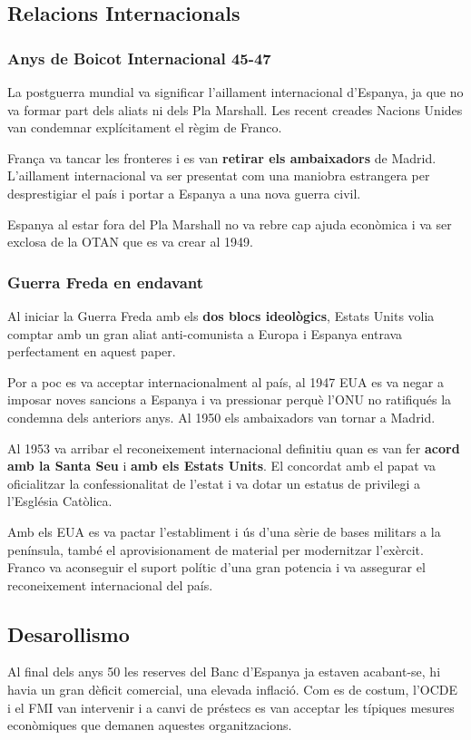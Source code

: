 \documentclass[arial,a4paper,print]{article}
\begin{document}
\subsection{Relacions Internacionals}
\subsubsection{Anys de Boicot Internacional 45-47}
La postguerra mundial va significar l'aillament internacional d'Espanya, ja que no va formar part dels aliats ni dels Pla Marshall. Les recent creades Nacions Unides van condemnar explícitament el règim de Franco. 

França va tancar les fronteres i es van \textbf{retirar els ambaixadors} de Madrid. L'aillament internacional va ser presentat com una maniobra estrangera per desprestigiar el país i portar a Espanya a una nova guerra civil. 

Espanya al estar fora del Pla Marshall no va rebre cap ajuda econòmica i va ser exclosa de la OTAN que es va crear al 1949. 

\subsubsection{Guerra Freda en endavant}
Al iniciar la Guerra Freda amb els \textbf{dos blocs ideològics}, Estats Units volia comptar amb un gran aliat anti-comunista a Europa i Espanya entrava perfectament en aquest paper. 

Por a poc es va acceptar internacionalment al país, al 1947 EUA es va negar a imposar noves sancions a Espanya i va pressionar perquè l'ONU no ratifiqués la condemna dels anteriors anys. Al 1950 els ambaixadors van tornar a Madrid. 

Al 1953 va arribar el reconeixement internacional definitiu quan es van fer \textbf{acord amb la Santa Seu} i \textbf{amb els Estats Units}. El concordat amb el papat va oficialitzar la confessionalitat de l'estat i va dotar un estatus de privilegi a l'Església Catòlica. 

Amb els EUA es va pactar l'establiment i ús d'una sèrie de bases militars a la península, també el aprovisionament de material per modernitzar l'exèrcit. Franco va aconseguir el suport polític d'una gran potencia i va assegurar el reconeixement internacional del país.  

\subsection{Desarollismo}
Al final dels anys 50 les reserves del Banc d'Espanya ja estaven acabant-se, hi havia un gran dèficit comercial, una elevada inflació. Com es de costum, l'OCDE i el FMI van intervenir i a canvi de préstecs es van acceptar les típiques mesures econòmiques que demanen aquestes organitzacions. 
\end{document}
